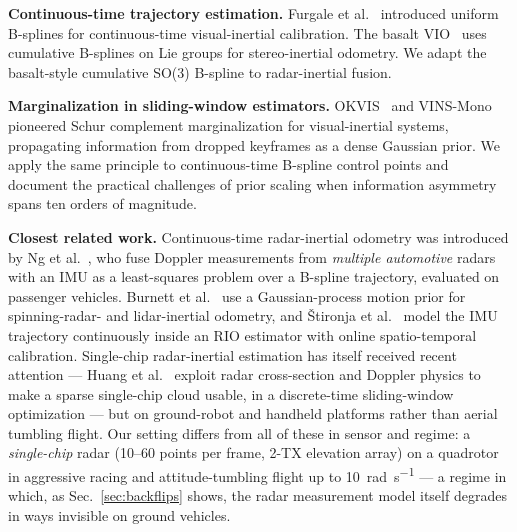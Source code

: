 \documentclass[conference]{IEEEtran}
\begin{document}
\textbf{Continuous-time trajectory estimation.}
Furgale et al.~\cite{furgale2013unified} introduced uniform B-splines
for continuous-time visual-inertial calibration.  The basalt
VIO~\cite{usenko2020basalt} uses cumulative B-splines on Lie groups
for stereo-inertial odometry. We adapt the basalt-style cumulative
SO(3) B-spline to radar-inertial fusion.

\textbf{Marginalization in sliding-window estimators.}
OKVIS~\cite{leutenegger2015keyframe} and
VINS-Mono~\cite{qin2018vins} pioneered Schur complement
marginalization for visual-inertial systems, propagating information
from dropped keyframes as a dense Gaussian prior. We apply the same
principle to continuous-time B-spline control points and document
the practical challenges of prior scaling when information asymmetry
spans ten orders of magnitude.

\textbf{Closest related work.}
Continuous-time radar-inertial odometry was introduced by
Ng et al.~\cite{ng2021ctrio}, who fuse Doppler measurements from
\emph{multiple automotive} radars with an IMU as a least-squares
problem over a B-spline trajectory, evaluated on passenger vehicles.
Burnett et al.~\cite{burnett2024gp} use a Gaussian-process motion
prior for spinning-radar- and lidar-inertial odometry, and
\v{S}tironja et al.~\cite{stironja2026rio} model the IMU trajectory
continuously inside an RIO estimator with online spatio-temporal
calibration.  Single-chip radar-inertial estimation has itself
received recent attention --- Huang et al.~\cite{huang2024lessismore}
exploit radar cross-section and Doppler physics to make a sparse
single-chip cloud usable, in a discrete-time sliding-window
optimization --- but on ground-robot and handheld platforms rather
than aerial tumbling flight.
Our setting differs from all of these in sensor and
regime: a \emph{single-chip} radar (10--60 points per frame,
2-TX elevation array) on a quadrotor in aggressive racing and
attitude-tumbling flight up to \SI{10}{\radian\per\second} --- a
regime in which, as Sec.~\ref{sec:backflips} shows, the radar
measurement model itself degrades in ways invisible on ground
vehicles.
\end{document}
